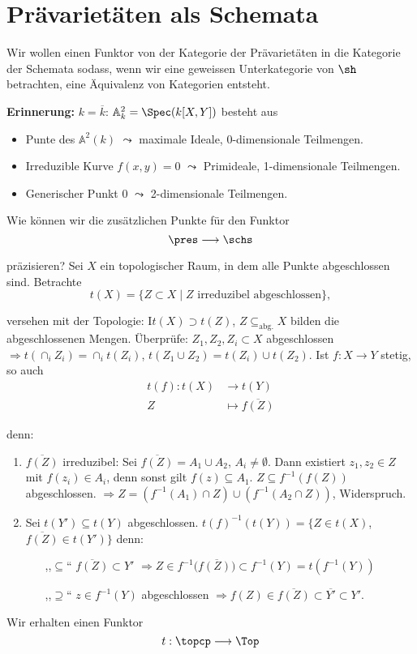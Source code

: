 \section{Prävarietäten als Schemata}

Wir wollen einen Funktor von der Kategorie der Prävarietäten in die
Kategorie der Schemata sodass, wenn wir eine geweissen Unterkategorie
von $\sh$ betrachten, eine Äquivalenz von Kategorien entsteht.\medskip{}

\textbf{Erinnerung: }$k=\overline{k}$: $\mathbb{A}_{k}^{2}=\Spec(k[X,Y])$
besteht aus
\begin{itemize}
\item Punte des $\mathbb{A}^{2}(k)$ $\leadsto$ maximale Ideale, 0-dimensionale
  Teilmengen.
\item Irreduzible Kurve $f(x,y)=0$ $\leadsto$ Primideale, 1-dimensionale
  Teilmengen.
\item Generischer Punkt 0 $\leadsto$ 2-dimensionale Teilmengen.
\end{itemize}
Wie können wir die zusätzlichen Punkte für den Funktor
\[
  \pres\longrightarrow\schs
\]

präzisieren? Sei $X$ ein topologischer Raum, in dem alle Punkte abgeschlossen
sind. Betrachte 
\[
  t(X)=\{Z\subset X\mid Z\text{ irreduzibel abgeschlossen}\},
\]

versehen mit der Topologie: I$t(X)\supset t(Z)$, $Z\subseteq_{\text{abg.}}X$
bilden die abgeschlossenen Mengen. Überprüfe: $Z_{1},Z_{2},Z_{i}\subset X$
abgeschlossen $\Longrightarrow t(\cap_{i}Z_{i})=\cap_{i}t(Z_{i})$,
$t(Z_{1}\cup Z_{2})=t(Z_{i})\cup t(Z_{2})$. Ist $f:X\rightarrow Y$
stetig, so auch
\begin{align*}
  t(f):t(X) & \longrightarrow t(Y)\\
  Z & \longmapsto\overline{f(Z)}
\end{align*}

denn:
\begin{enumerate}
\item $\overline{f(Z)}$ irreduzibel: Sei $\overline{f(Z)}=A_{1}\cup A_{2}$,
  $A_{i}\neq\emptyset$. Dann existiert $z_{1},z_{2}\in Z$ mit $f(z_{i})\in A_{i}$,
  denn sonst gilt $f(z)\subseteq A_{1}$. $Z\subseteq f^{-1}(f(Z))$
  abgeschlossen. $\Longrightarrow Z=(f^{-1}(A_{1})\cap Z)\cup(f^{-1}(A_{2}\cap Z))$,
  Widerspruch.
\item Sei $t(Y')\subseteq t(Y)$ abgeschlossen. $t(f)^{-1}(t(Y))=\{Z\in t(X)$,
  $\overline{f(Z)}\in t(Y')\}$ denn:
  \begin{itemize}
  \item[,,$\subseteq$``] $\overline{f(Z)}\subset Y'$ $\Longrightarrow Z\in f^{-1}(\overline{f(Z))}\subset f^{-1}(Y)=t(f^{-1}(Y))$
  \item[,,$\supseteq$``] $z\in f^{-1}(Y)$ abgeschlossen $\Longrightarrow f(Z)\in\overline{f(Z)}\subset\overline{Y'}\subset Y'$.
  \end{itemize}
\end{enumerate}
Wir erhalten einen Funktor
\[
  t:\topcp\longrightarrow\Top
\]

